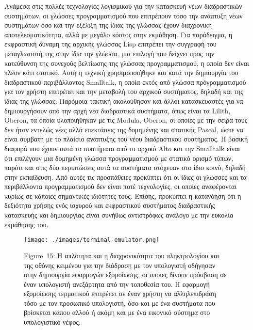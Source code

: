 \documentclass[
]{article}
\begin{document}
Ανάμεσα στις πολλές τεχνολογίες λογισμικού για την κατασκευή νέων
διαδραστικών συστημάτων, οι γλώσσες προγραμματισμού που επιτρέπουν τόσο
την ανάπτυξη νέων συστημάτων όσο και την εξέλιξη της ίδιας της γλώσσας
έχουν διαχρονική αποτελεσματικότητα, αλλά με μεγάλο κόστος στην
εκμάθηση. Για παράδειγμα, η εκφραστική δύναμη της αρχικής γλώσσας Lisp
επιτρέπει την συγγραφή του μεταγλωτιστή της στην ίδια την γλώσσα, μια
επιλογή που δείχνει προς την κατεύθυνση της συνεχούς βελτίωσης της
γλώσσας προγραμματισμού, η οποία δεν είναι πλέον κάτι στατικό. Αυτή η
τεχνική χρησιμοποιήθηκε και κατά την δημιουργία του διαδραστικού
περιβάλλοντος Smalltalk, η οποία εκτός από γλώσσα πρόγραμματισμού για
τον χρήστη επιτρέπει και την μεταβολή του αρχικού συστήματος, δηλαδή και
της ίδιας της γλώσσας. Παρόμοια τακτική ακολούθησαν και άλλοι
κατασκευαστές για να δημιουργήσουν από την αρχή νέα διαδραστικά
συστήματα, όπως είναι τα Lilith, Oberon, τα οποία υλοποιήθηκαν με τις
Modula, Oberon, οι οποίες με την σειρά τους δεν ήταν εντελώς νέες αλλά
επεκτάσεις της δομημένης και στατικής Pascal, ώστε να είναι συμβατή με
το πλαίσιο ανάπτυξης του νέου διαδραστικού συστήματος. Η βασική διαφορά
που έχουν αυτά τα συστήματα από το αρχικό Alto και την Smalltalk είναι
ότι επιλέγουν μια δομημένη γλώσσα προγραμματισμού με στατικό ορισμό
τύπων, παρότι και στις δύο περιπτώσεις αυτά τα συστήματα στόχευαν στο
ίδιο κοινό, δηλαδή στην εκπαίδευση. Από αυτές τις προσπάθειες προκύπτει
ότι οι ίδιες οι γλώσσες και τα περιβάλλοντα προγραμματισμού δεν είναι
ποτέ τεχνολογίες, οι οποίες αναφέρονται κυρίως σε κάποιες σημαντικές
ιδιότητες τους. Επίσης, προκύπτει η κατανόηση ότι η δεξιότητα χρήσης
ενός ισχυρού και εκφραστικού συστήματος διαδραστικής κατασκευής και
δημιουργίας είναι συνήθως αντιστρόφως ανάλογο με την ευκολία εκμάθησης
του.

\leavevmode{}%
\begin{figure}
\hypertarget{fig:terminal-emulator}{%
\centering
\texttt{[image: ./images/terminal-emulator.png]}
\caption{Figure~15: Η απλότητα και η διαχρονικότητα του πληκτρολογίου
και της οθόνης κειμένου για την διάδραση με τον υπολογιστή οδήγησαν στην
δημιουργία εφαρμογών εξομοίωσης, οι οποίες δίνουν πρόσβαση σε έναν
υπολογιστή ανεξάρτητα από την τοποθεσία του. Η εφαρμογή εξομοίωσης
τερματικού επιτρέπει σε έναν χρήστη να αλληλεπιδράση τόσο με τον
προσωπικό υπολογιστή, όσο και με ένα συστήματα που βρίσκεται κάπου αλλού
ή ακόμη και με ένα εικονικό σύστημα στο υπολογιστικό
νέφος.}\label{fig:terminal-emulator}
}
\end{figure}
\end{document}
